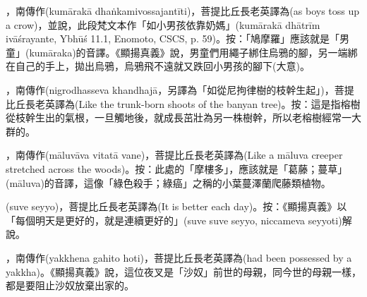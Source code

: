 \startitemgroup[noteitems]
\item{}，南傳作(kumārakā dhaṅkamivossajantīti)，菩提比丘長老英譯為(as boys toss up a crow)，並說，此段梵文本作「如小男孩依靠奶媽」(kumārakā dhātrīm ivāśrayante, Ybhūś 11.1, Enomoto, CSCS, p. 59)。按：「鳩摩羅」應該就是「男童」(kumāraka)的音譯。《顯揚真義》說，男童們用繩子綁住烏鴉的腳，另一端綁在自己的手上，拋出烏鴉，烏鴉飛不遠就又跌回小男孩的腳下(大意)。
\stopitemgroup

\startitemgroup[noteitems]
\item{}，南傳作(nigrodhasseva khandhajā，另譯為「如從尼拘律樹的枝幹生起」)，菩提比丘長老英譯為(Like the trunk-born shoots of the banyan tree)。按：這是指榕樹從枝幹生出的氣根，一旦觸地後，就成長茁壯為另一株樹幹，所以老榕樹經常一大群的。
\stopitemgroup

\startitemgroup[noteitems]
\item{}，南傳作(māluvāva vitatā vane)，菩提比丘長老英譯為(Like a māluva creeper stretched across the woods)。按：此處的「摩樓多」，應該就是「葛藤；蔓草」(māluva)的音譯，這像「綠色殺手；綠癌」之稱的小葉蔓澤蘭爬藤類植物。
\stopitemgroup

\startitemgroup[noteitems]
\item{}(suve seyyo)，菩提比丘長老英譯為(It is better each day)。按：《顯揚真義》以「每個明天是更好的，就是連續更好的」(suve suve seyyo, niccameva seyyoti)解說。
\stopitemgroup

\startitemgroup[noteitems]
\item{}，南傳作(yakkhena gahito hoti)，菩提比丘長老英譯為(had been possessed by a yakkha)。《顯揚真義》說，這位夜叉是「沙奴」前世的母親，同今世的母親一樣，都是要阻止沙奴放棄出家的。
\stopitemgroup

